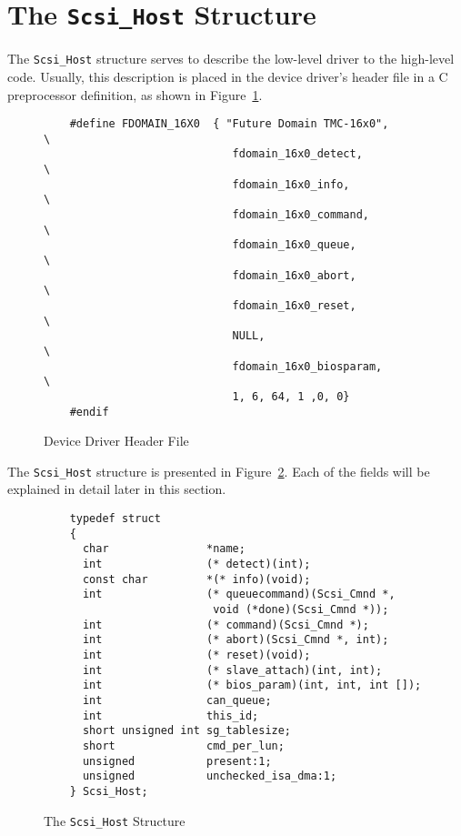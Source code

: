 \section{The {\tt Scsi\_Host} Structure}

The \verb|Scsi_Host| structure serves to describe the low-level driver to
the high-level code.  Usually, this description is placed in the device
driver's header file in a C preprocessor definition, as shown in
Figure~\ref{fig:header}.

\begin{figure}[hbtp]
  \leavevmode
  \begin{center}
    \begin{verbatim}
    #define FDOMAIN_16X0  { "Future Domain TMC-16x0",          \
                             fdomain_16x0_detect,              \
                             fdomain_16x0_info,                \
                             fdomain_16x0_command,             \
                             fdomain_16x0_queue,               \
                             fdomain_16x0_abort,               \
                             fdomain_16x0_reset,               \
                             NULL,                             \
                             fdomain_16x0_biosparam,           \
                             1, 6, 64, 1 ,0, 0}
    #endif
    \end{verbatim}
    \caption{Device Driver Header File}
    \label{fig:header}
  \end{center}
\end{figure}

The \verb|Scsi_Host| structure is presented in Figure~\ref{fig:scsi.host}.
Each of the fields will be explained in detail later in this section.

\begin{figure}[hbtp]
  \leavevmode
  \begin{center}
    \begin{verbatim}
    typedef struct     
    {
      char               *name;
      int                (* detect)(int); 
      const char         *(* info)(void);
      int                (* queuecommand)(Scsi_Cmnd *,
                          void (*done)(Scsi_Cmnd *));
      int                (* command)(Scsi_Cmnd *);
      int                (* abort)(Scsi_Cmnd *, int);
      int                (* reset)(void);
      int                (* slave_attach)(int, int);
      int                (* bios_param)(int, int, int []);
      int                can_queue;
      int                this_id;
      short unsigned int sg_tablesize;
      short              cmd_per_lun;
      unsigned           present:1;     
      unsigned           unchecked_isa_dma:1;
    } Scsi_Host;
    \end{verbatim}
    \caption{The {\tt Scsi\_Host} Structure}
    \label{fig:scsi.host}
  \end{center}
\end{figure}


